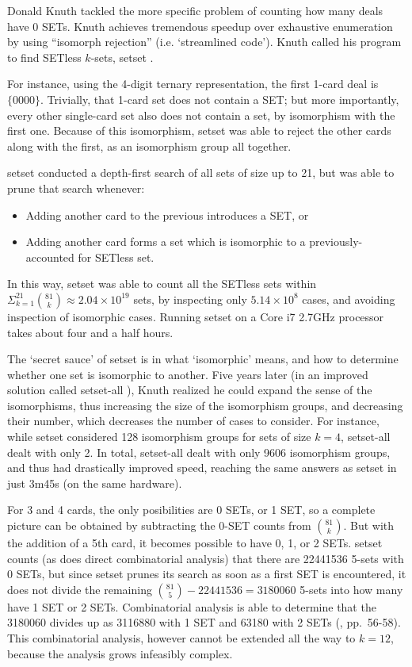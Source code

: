 \documentclass[10pt]{amsart}
\newcommand{\SETSETb}{{\sc setset }}
\newcommand{\SETSETAb}{{\sc setset-all }}
\begin{document}
Donald Knuth tackled the more specific problem of counting how many deals have 0
SETs. Knuth achieves tremendous speedup over exhaustive enumeration by using
``isomorph rejection'' (i.e. `streamlined code'). Knuth called his program to
find SETless $k$-sets, \SETSETb \cite{SETSET}. 

For instance, using the 4-digit ternary representation, the first 1-card deal is
$\{0000\}$. Trivially, that 1-card set does not contain a SET; but more
importantly, every other single-card set also does not contain a set, by
isomorphism with the first one. Because of this isomorphism, \SETSETb was able to
reject the other cards along with the first, as an isomorphism group all
together.

\SETSETb conducted a depth-first search of all sets of size up to 21, but was
able to prune that search whenever:
\begin{itemize}
\item Adding another card to the previous introduces a SET, or
\item Adding another card forms a set which is isomorphic to a
  previously-accounted for SETless set.
\end{itemize}
In this way, \SETSETb was able to count all the SETless sets within
$\Sigma_{k=1}^{21}\binom{81}{k}\approx 2.04\times 10^{19}$ sets, by inspecting
only $5.14\times 10^8$ cases, and avoiding inspection of isomorphic
cases. Running \SETSETb on a Core i7 2.7GHz processor takes about four and a half
hours.

The `secret sauce' of \SETSETb is in what `isomorphic' means, and how to
determine whether one set is isomorphic to another. Five years later (in an
improved solution called \SETSETAb \cite{SETSET-ALL}), Knuth realized he could
expand the sense of the isomorphisms, thus increasing the size of the
isomorphism groups, and decreasing their number, which decreases the number of
cases to consider. For instance, while \SETSETb considered 128 isomorphism groups
for sets of size $k=4$, \SETSETAb dealt with only 2. In total, \SETSETAb dealt
with only 9606 isomorphism groups, and thus had drastically improved speed,
reaching the same answers as \SETSETb in just 3m45s (on the same hardware).

For 3 and 4 cards, the only posibilities are 0 SETs, or 1 SET, so a complete
picture can be obtained by subtracting the 0-SET counts from
$\binom{81}{k}$. But with the addition of a 5th card, it becomes possible to
have 0, 1, or 2 SETs. \SETSETb counts (as does direct combinatorial analysis)
that there are 22441536 5-sets with 0 SETs, but since \SETSETb prunes its search
as soon as a first SET is encountered, it does not divide the remaining
$\binom{81}{5}-22441536=3180060$ 5-sets into how many have 1 SET or 2
SETs. Combinatorial analysis is able to determine that the 3180060 divides up as
3116880 with 1 SET and 63180 with 2 SETs (\cite{JOS}, pp.~56-58). This
combinatorial analysis, however cannot be extended all the way to $k=12$,
because the analysis grows infeasibly complex.
\end{document}
